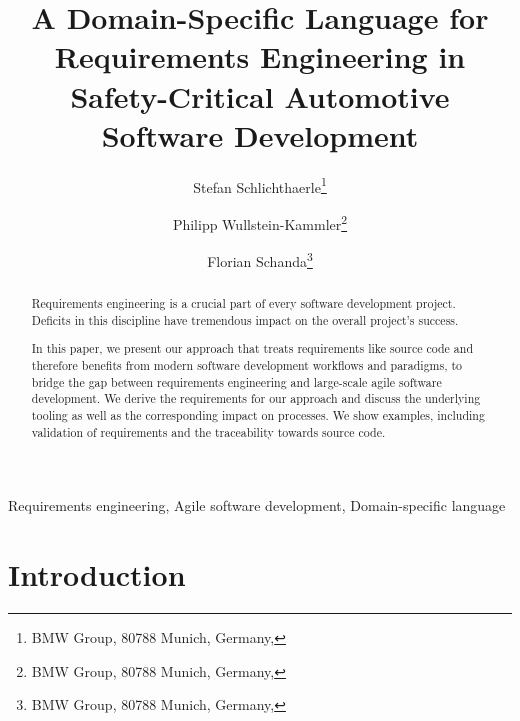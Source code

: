 \documentclass[english]{lni}
\begin{document}
\title[Treat Requirements Like Code]{A Domain-Specific Language for Requirements Engineering in Safety-Critical Automotive Software Development}

\author[Stefan Schlichthaerle \and%
Philipp Wullstein-Kammler \and%
Florian Schanda]{%
  Stefan Schlichthaerle\footnote{BMW Group, 80788 Munich, Germany, } \and%
  Philipp Wullstein-Kammler\footnote{BMW Group, 80788 Munich, Germany, } \and%
  Florian Schanda\footnote{BMW Group, 80788 Munich, Germany, }}

\maketitle

\begin{abstract}
  Requirements engineering is a crucial part of every software
  development project. Deficits in this discipline have tremendous
  impact on the overall project's success.

  In this paper, we present our approach that
  treats requirements like source code and therefore benefits from
  modern software development workflows and paradigms, to bridge the
  gap between requirements engineering and large-scale agile software
  development. We derive the requirements for our approach and discuss
  the underlying tooling as well as the corresponding impact on
  processes. We show examples, including validation of
  requirements and the traceability towards source code.
\end{abstract}

\begin{keywords}
Requirements engineering, Agile software development, Domain-specific language
\end{keywords}

\section{Introduction}
\end{document}
